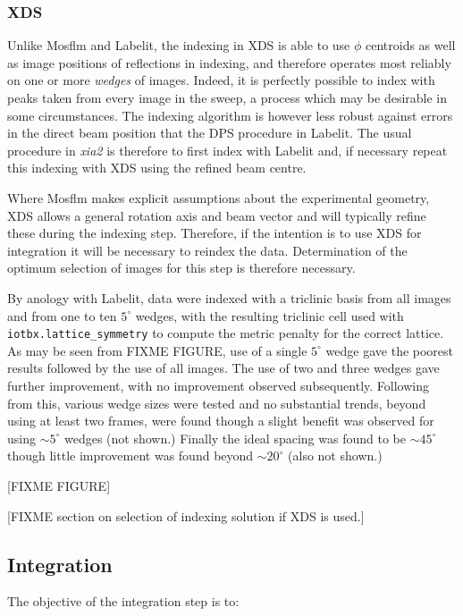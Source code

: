\documentclass[a4paper,11pt]{article}
\begin{document}
\subsubsection{XDS}

Unlike Mosflm and Labelit, the indexing in XDS is able to use $\phi$
centroids as well as image positions of reflections in indexing, and
therefore operates most reliably on one or more \emph{wedges} of
images. Indeed, it is perfectly possible to index with peaks taken
from every image in the sweep, a process which may be desirable in some
circumstances. The indexing algorithm is however less robust against
errors in the direct beam position that the DPS procedure in
Labelit. The usual procedure in \emph{xia2} is therefore to first
index with Labelit and, if necessary repeat this indexing with XDS
using the refined beam centre. 

Where Mosflm makes explicit assumptions about the experimental
geometry, XDS allows a general rotation axis and beam vector and will
typically refine these during the indexing step. Therefore, if the
intention is to use XDS for integration it will be necessary to
reindex the data. Determination of the optimum selection of images for
this step is therefore necessary.

By anology with Labelit, data were indexed with a triclinic basis
from all images and from one to ten $5^{\circ}$ wedges, with the
resulting triclinic cell used with \verb|iotbx.lattice_symmetry| to
compute the metric penalty for the correct lattice. As may be seen
from FIXME FIGURE, use of a single $5^{\circ}$ wedge gave the poorest
results followed by the use of all images. The use of two and three
wedges gave further improvement, with no improvement observed
subsequently. Following from this, various wedge sizes were tested and
no substantial trends, beyond using at least two frames, were found
though a slight benefit was observed for using $\sim 5^{\circ}$ wedges
(not shown.) Finally the ideal spacing was found to be $\sim
45^{\circ}$ though little improvement was found beyond $\sim
20^{\circ}$ (also not shown.)  

[FIXME FIGURE]

[FIXME section on selection of indexing solution if XDS is used.]

\subsection{Integration}

The objective of the integration step is to:
\end{document}
